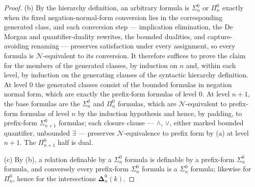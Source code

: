 \documentclass[11pt,oneside,openany]{book}
\theoremstyle{definition}
\theoremstyle{plain}
\theoremstyle{remark}
\begin{document}
\begin{proof}
(b) By the hierarchy definition, an arbitrary formula is \(\Sigma^0_n\)
or \(\Pi^0_n\) exactly when its fixed negation-normal-form conversion
lies in the corresponding generated class, and each conversion step ---
implication elimination, the De Morgan and quantifier-duality rewrites,
the bounded dualities, and capture-avoiding renaming --- preserves
satisfaction under every assignment, so every formula is
\(\mathcal N\)-equivalent to its conversion.  It therefore suffices to
prove the claim for the members of the generated classes, by induction on
\(n\) and, within each level, by induction on the generating clauses of
the syntactic hierarchy definition.  At level \(0\) the generated classes
consist of the bounded formulas in negation normal form, which are
exactly the prefix-form formulas of level \(0\).  At level \(n+1\), the
base formulas are the
\(\Sigma^0_n\) and \(\Pi^0_n\) formulas, which are
\(\mathcal N\)-equivalent to prefix-form formulas of level \(n\) by the
induction hypothesis and hence, by padding, to prefix-form
\(\Sigma^0_{n+1}\) formulas; each closure clause --- \(\land\), \(\lor\),
either marked bounded quantifier, unbounded \(\exists\) --- preserves
\(\mathcal N\)-equivalence to prefix form by (a) at level \(n+1\).  The
\(\Pi^0_{n+1}\) half is dual.

(c) By (b), a relation definable by a \(\Sigma^0_n\) formula is definable
by a prefix-form \(\Sigma^0_n\) formula, and conversely every prefix-form
\(\Sigma^0_n\) formula is a \(\Sigma^0_n\) formula; likewise for
\(\Pi^0_n\), hence for the intersections \(\boldsymbol{\Delta}^0_n(k)\).
\end{proof}
\end{document}
